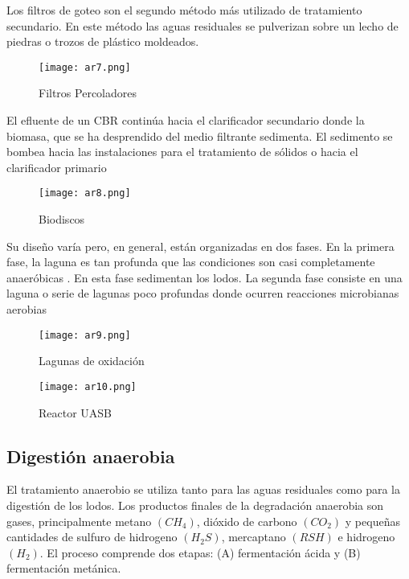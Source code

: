\begin{definition}
    Los filtros de goteo son el segundo método más utilizado de tratamiento secundario. En este método las aguas residuales se pulverizan sobre un lecho de piedras o trozos de plástico moldeados.
\end{definition}
\begin{figure}[h!]
\centering
  \texttt{[image: ar7.png]}
  \caption{Filtros Percoladores}
  \label{ar7}
\end{figure}
\begin{definition}[Biodiscos]
    El efluente de un CBR continúa hacia el clarificador secundario donde la biomasa, que se ha desprendido del medio filtrante sedimenta. El sedimento se bombea hacia las instalaciones para el tratamiento de sólidos o hacia el clarificador primario
\end{definition}
\begin{figure}[h!]
\centering
  \texttt{[image: ar8.png]}
  \caption{Biodiscos}
  \label{ar8}
\end{figure}
\begin{definition}
    Su diseño varía pero, en general, están organizadas en dos fases. En la primera fase, la laguna es tan profunda que las condiciones son casi completamente anaeróbicas . En esta fase sedimentan los lodos. La segunda fase consiste en una laguna o serie de lagunas poco profundas donde ocurren reacciones microbianas aerobias
\end{definition}
\begin{figure}[h!]
\centering
  \texttt{[image: ar9.png]}
  \caption{Lagunas de oxidación}
  \label{ar9}
\end{figure}
\begin{figure}[h!]
\centering
  \texttt{[image: ar10.png]}
  \caption{Reactor UASB}
  \label{ar10}
\end{figure}

\subsection{Digestión anaerobia}
El tratamiento anaerobio se utiliza tanto para las aguas residuales como para la digestión de los lodos. Los productos finales de la degradación anaerobia son gases, principalmente metano $(CH_4)$, dióxido de carbono $(CO_2)$ y pequeñas cantidades de sulfuro de hidrogeno $(H_2S)$, mercaptano $(RSH)$ e hidrogeno $(H_2)$. El proceso comprende dos etapas: (A) fermentación ácida y (B) fermentación metánica.

